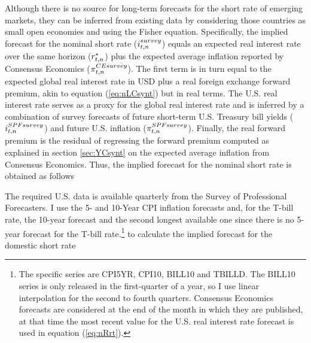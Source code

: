 {Although there is no source for long-term forecasts for the short rate of emerging markets, they can be inferred from existing data by considering those countries as small open economies and using the Fisher equation.  
Specifically, the implied forecast for the nominal short rate (\(i_{t,n}^{survey}\)) equals an expected real interest rate over the same horizon (\(r_{t,n}^{*}\)) plus the expected average inflation %
reported by Consensus Economics (\(\pi^{CE survey}_{t,n}\)).
The first term is in turn equal to the expected global real interest rate in USD plus a real foreign exchange forward premium, akin to equation (\ref{eq:nLCsynt}) but in real terms.
The U.S. real interest rate serves as a proxy for the global real interest rate and is inferred by a combination of survey forecasts of future short-term U.S. Treasury bill yields (\(i^{SPF survey}_{t,n}\)) and future U.S. inflation (\(\pi^{SPF survey}_{t,n}\)).
Finally, the real forward premium is the residual of regressing the forward premium computed as explained in section \ref{sec:YCsynt} on the expected average inflation from Consensus Economics. 
Thus, the implied forecast for the nominal short rate is obtained as follows

The required U.S. data is available quarterly from the Survey of Professional Forecasters.
I use the 5- and 10-Year CPI inflation forecasts and, for the T-bill rate, the 10-year forecast and the second longest available one
since there is no 5-year forecast for the T-bill rate.\footnote{ The specific series are CPI5YR, CPI10, BILL10 and TBILLD. The BILL10 series is only released in the first-quarter of a year, so I use linear interpolation for the second to fourth quarters. Consensus Economics forecasts are considered at the end of the month in which they are published, at that time the most recent value for the U.S. real interest rate forecast is used in equation (\ref{eq:nRrt}).} to calculate the implied forecast for the domestic short rate
}
